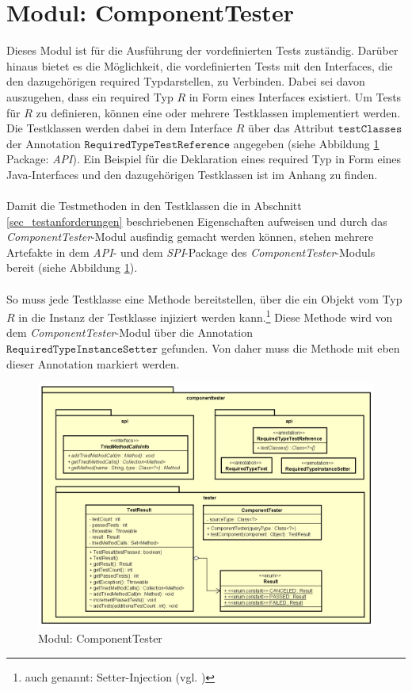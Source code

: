 \section{Modul: ComponentTester}\label{sec_Impl_CT}
Dieses Modul ist für die Ausführung der vordefinierten Tests zuständig. Darüber hinaus bietet es die Möglichkeit, die vordefinierten Tests mit den Interfaces, die den dazugehörigen required Typdarstellen, zu Verbinden. Dabei sei davon auszugehen, dass ein required Typ $R$ in Form eines Interfaces existiert. Um Tests für $R$ zu definieren, können eine oder mehrere Testklassen implementiert werden. Die Testklassen werden dabei in dem Interface $R$ über das Attribut $\texttt{testClasses}$ der Annotation $\texttt{RequiredTypeTestReference}$ angegeben (siehe Abbildung \ref{fig_cdCompTester} Package: \emph{API}). Ein Beispiel für die Deklaration eines required Typ in Form eines Java-Interfaces und den dazugehörigen Testklassen ist im Anhang zu finden.
\\\\
Damit die Testmethoden in den Testklassen die in Abschnitt \ref{sec_testanforderungen} beschriebenen Eigenschaften aufweisen und durch das \emph{ComponentTester}-Modul ausfindig gemacht werden können, stehen mehrere Artefakte in dem \emph{API}- und dem \emph{SPI}-Package des \emph{ComponentTester}-Moduls bereit (siehe Abbildung \ref{fig_cdCompTester}).
\\\\
So muss jede Testklasse eine Methode bereitstellen, über die ein Objekt vom Typ $R$ in die Instanz der Testklasse injiziert werden kann.\footnote{auch genannt: Setter-Injection (vgl. \cite{setterinfjection})} Diese Methode wird von dem \emph{ComponentTester}-Modul über die Annotation $\texttt{RequiredTypeInstanceSetter}$ gefunden. Von daher muss die Methode mit eben dieser Annotation markiert werden.
\begin{figure}[h!]
\centering
\includegraphics[scale=0.6]{pics/cd_ComponentTester.png}
\caption{Modul: ComponentTester}
\label{fig_cdCompTester}
\end{figure}
